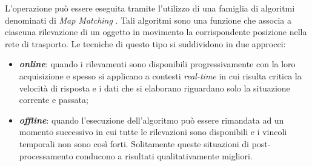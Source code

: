 L'operazione può essere eseguita tramite l'utilizzo di una famiglia di algoritmi denominati di \emph{Map Matching} \cite[capitolo~3.3.1]{mdme}. Tali algoritmi sono una funzione che associa a ciascuna rilevazione di un oggetto in movimento la corrispondente posizione nella rete di trasporto. 
Le tecniche di questo tipo si suddividono in due approcci:
\begin{itemize}
\item \textbf{\emph{online}}: quando i rilevamenti sono disponibili progressivamente con la loro acquisizione e spesso si applicano a contesti \emph{real-time} in cui risulta critica la velocità di risposta e i dati che si elaborano riguardano solo la situazione corrente e passata;
\item \textbf{\emph{offline}}: quando l'esecuzione dell'algoritmo può essere rimandata ad un momento successivo in cui tutte le rilevazioni sono disponibili e i vincoli temporali non sono così forti. Solitamente queste situazioni di post-processamento conducono a risultati qualitativamente migliori. 
\end{itemize}

